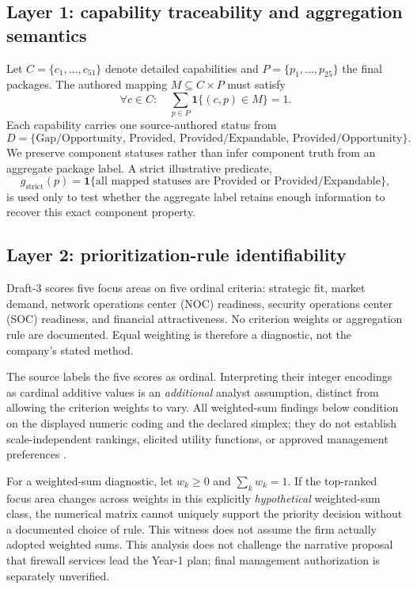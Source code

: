 \documentclass[systems,article,submit,moreauthors]{Definitions/mdpi}
\begin{document}
\subsection{Layer 1: capability traceability and aggregation semantics}
Let $C=\{c_1,\ldots,c_{51}\}$ denote detailed capabilities and $P=\{p_1,\ldots,p_{25}\}$ the final packages. The authored mapping $M\subseteq C\times P$ must satisfy
\[
\forall c\in C:\quad \sum_{p\in P}\mathbf{1}\{(c,p)\in M\}=1.
\]
Each capability carries one source-authored status from
\[
D=\{\text{Gap/Opportunity, Provided, Provided/Expandable, Provided/Opportunity}\}.
\]
We preserve component statuses rather than infer component truth from an aggregate package label. A strict illustrative predicate,
\[
g_{\mathrm{strict}}(p)=
\mathbf{1}\{\text{all mapped statuses are Provided or Provided/Expandable}\},
\]
is used only to test whether the aggregate label retains enough information to recover this exact component property.

\subsection{Layer 2: prioritization-rule identifiability}
Draft-3 scores five focus areas on five ordinal criteria: strategic fit, market demand, network operations center (NOC) readiness, security operations center (SOC) readiness, and financial attractiveness. No criterion weights or aggregation rule are documented. Equal weighting is therefore a diagnostic, not the company's stated method.

The source labels the five scores as ordinal. Interpreting their integer encodings as cardinal additive values is an \emph{additional} analyst assumption, distinct from allowing the criterion weights to vary. All weighted-sum findings below condition on the displayed numeric coding and the declared simplex; they do not establish scale-independent rankings, elicited utility functions, or approved management preferences \cite{Greco2008,PunkkaSalo2014}.

For a weighted-sum diagnostic, let $w_k\ge0$ and $\sum_k w_k=1$. If the top-ranked focus area changes across weights in this explicitly \emph{hypothetical} weighted-sum class, the numerical matrix cannot uniquely support the priority decision without a documented choice of rule. This witness does not assume the firm actually adopted weighted sums. This analysis does not challenge the narrative proposal that firewall services lead the Year-1 plan; final management authorization is separately unverified.
\end{document}
